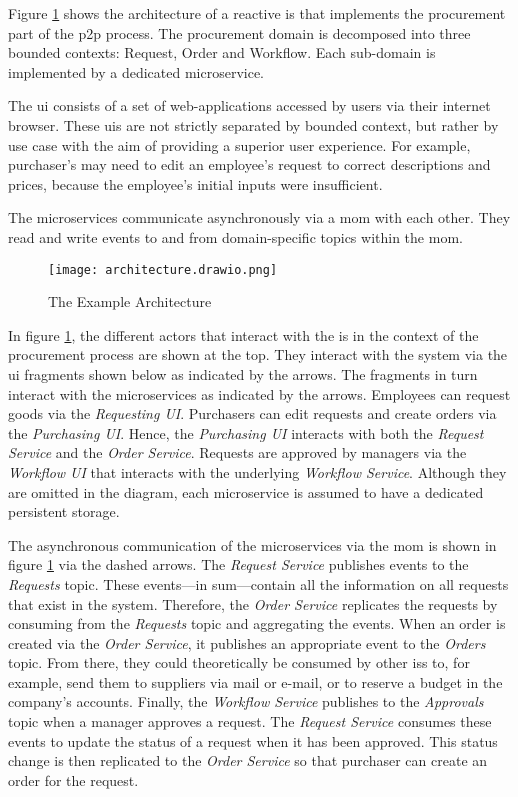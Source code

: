 Figure \ref{fig:example-architecture} shows the architecture of a reactive \gls{is} that implements the procurement part of the \gls{p2p} process.
The procurement domain is decomposed into three bounded contexts: Request, Order and Workflow.
Each sub-domain is implemented by a dedicated microservice.

The \gls{ui} consists of a set of web-applications accessed by users via their internet browser.
These \glspl{ui} are not strictly separated by bounded context, but rather by use case with the aim of providing a superior user experience.
For example, purchaser's may need to edit an employee's request to correct descriptions and prices, because the employee's initial inputs were insufficient.

The microservices communicate asynchronously via a \gls{mom} with each other.
They read and write events to and from domain-specific topics within the \gls{mom}.

\begin{figure}[H]
  \centering
  \texttt{[image: architecture.drawio.png]}
  \caption{The Example Architecture}\label{fig:example-architecture}
\end{figure}

In figure \ref{fig:example-architecture}, the different actors that interact with the \gls{is} in the context of the procurement process are shown at the top.
They interact with the system via the \gls{ui} fragments shown below as indicated by the arrows.
The fragments in turn interact with the microservices as indicated by the arrows.
Employees can request goods via the \emph{Requesting UI}.
Purchasers can edit requests and create orders via the \emph{Purchasing UI}.
Hence, the \emph{Purchasing UI} interacts with both the \emph{Request Service} and the \emph{Order Service}.
Requests are approved by managers via the \emph{Workflow UI} that interacts with the underlying \emph{Workflow Service}.
Although they are omitted in the diagram, each microservice is assumed to have a dedicated persistent storage.

The asynchronous communication of the microservices via the \gls{mom} is shown in figure \ref{fig:example-architecture} via the dashed arrows.
The \emph{Request Service} publishes events to the \emph{Requests} topic.
These events---in sum---contain all the information on all requests that exist in the system.
Therefore, the \emph{Order Service} replicates the requests by consuming from the \emph{Requests} topic and aggregating the events.
When an order is created via the \emph{Order Service}, it publishes an appropriate event to the \emph{Orders} topic.
From there, they could theoretically be consumed by other \glspl{is} to, for example, send them to suppliers via mail or e-mail, or to reserve a budget in the company's accounts.
Finally, the \emph{Workflow Service} publishes to the \emph{Approvals} topic when a manager approves a request.
The \emph{Request Service} consumes these events to update the status of a request when it has been approved.
This status change is then replicated to the \emph{Order Service} so that purchaser can create an order for the request.

